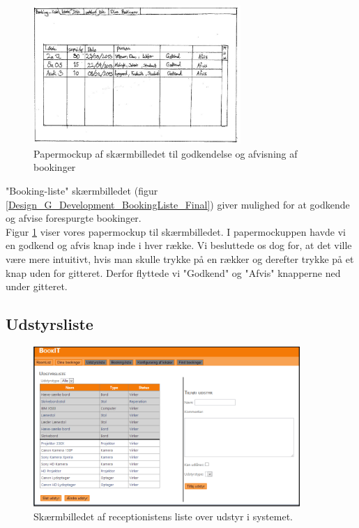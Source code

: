 \begin{figure}[h!]
  \centering
    \includegraphics[width=0.7\textwidth]{Appendix/GUI-Prototype/PaperMockup/GodkendBookinger_001}
  \caption{Papermockup af skærmbilledet til godkendelse og afvisning af bookinger}
\label{Design_G_Development_BookingListe}
\end{figure} 

"Booking-liste" skærmbilledet (figur \ref{Design_G_Development_BookingListe_Final}) giver mulighed for at godkende og afvise forespurgte bookinger.
\\Figur \ref{Design_G_Development_BookingListe} viser vores papermockup til skærmbilledet. I papermockuppen havde vi en godkend og afvis knap inde i hver række. Vi besluttede os dog for, at det ville være mere intuitivt, hvis man skulle trykke på en rækker og derefter trykke på et knap uden for gitteret. Derfor flyttede vi "Godkend" og "Afvis" knapperne ned under gitteret.

\subsection{Udstyrsliste}
\begin{figure}[h!]
  \centering
    \includegraphics[width=0.9\textwidth]{Appendix/GUI-Prototype/DigitalMockup/UdstyrsListe}
  \caption{Skærmbilledet af receptionistens liste over udstyr i systemet.}
\label{Design_G_Development_UdstyrsListe_Final}
\end{figure} 

